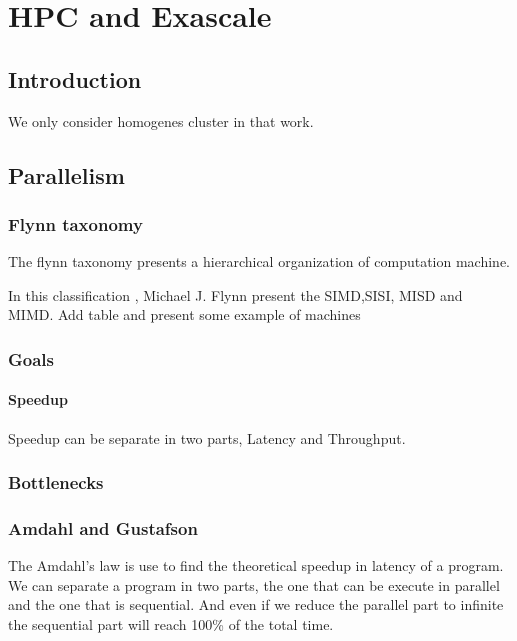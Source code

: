 \chapter{HPC and Exascale}


\section{Introduction}

We only consider homogenes cluster in that work.

\section{Parallelism}

\subsection{Flynn taxonomy}

The flynn taxonomy presents a hierarchical organization of computation machine.

In this classification \cite{flynn1972some}, Michael J. Flynn present the SIMD,SISI, MISD and MIMD.
Add table and present some example of machines

\subsection{Goals}

\subsubsection{Speedup}

Speedup can be separate in two parts, Latency and Throughput.

\subsection{Bottlenecks}

\subsection{Amdahl and Gustafson}

The Amdahl's\cite{amdahl1967validity} law is use to find the theoretical speedup in latency of a program.
We can separate a program in two parts, the one that can be execute in parallel and the one that is sequential. 
And even if we reduce the parallel part to infinite the sequential part will reach 100\% of the total time. 

